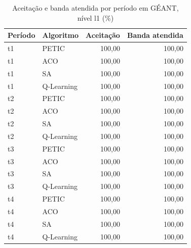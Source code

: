 \begin{table}[htb]
    \centering
    \scriptsize
    \caption{Aceitação e banda atendida por período em GÉANT, nível l1 (\%)}
    \label{tab:periodos-geant-l1}
    \begin{tabular}{llrr}
        \hline
        Período & Algoritmo & Aceitação & Banda atendida \\
        \hline
        t1 & PETIC & 100,00 & 100,00 \\
        t1 & ACO & 100,00 & 100,00 \\
        t1 & SA & 100,00 & 100,00 \\
        t1 & Q-Learning & 100,00 & 100,00 \\
        t2 & PETIC & 100,00 & 100,00 \\
        t2 & ACO & 100,00 & 100,00 \\
        t2 & SA & 100,00 & 100,00 \\
        t2 & Q-Learning & 100,00 & 100,00 \\
        t3 & PETIC & 100,00 & 100,00 \\
        t3 & ACO & 100,00 & 100,00 \\
        t3 & SA & 100,00 & 100,00 \\
        t3 & Q-Learning & 100,00 & 100,00 \\
        t4 & PETIC & 100,00 & 100,00 \\
        t4 & ACO & 100,00 & 100,00 \\
        t4 & SA & 100,00 & 100,00 \\
        t4 & Q-Learning & 100,00 & 100,00 \\
        \hline
    \end{tabular}
\end{table}

